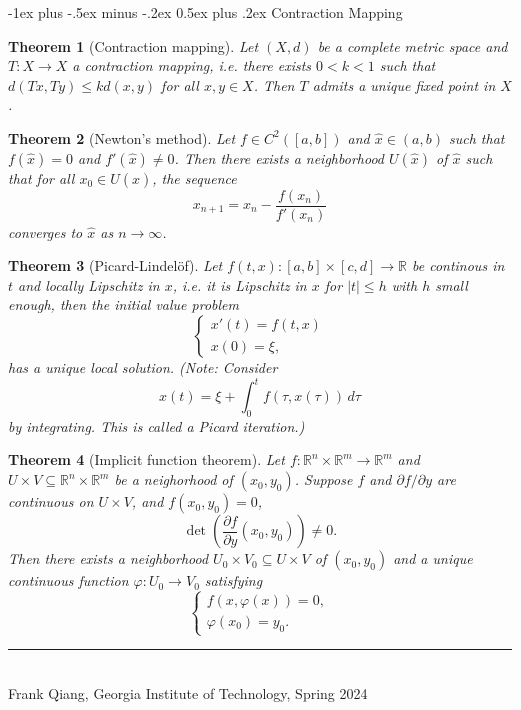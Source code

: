 \documentclass[10pt,landscape]{article}
\makeatletter
\newtheorem{theorem}{Theorem}
\newcommand{\R}{\mathbb{R}}
\renewcommand{\section}{\@startsection{section}{1}{0mm}%
                                {-1ex plus -.5ex minus -.2ex}%
                                {0.5ex plus .2ex}%
                                {\normalfont\large\bfseries}}
\makeatother
\begin{document}
\begin{multicols}{3}
\section{Contraction Mapping}
\begin{theorem}[Contraction mapping]
  Let $(X, d)$ be a complete metric space and
  $T : X \to X$ a contraction mapping, i.e.
  there exists $0 < k < 1$ such that
  $d(Tx, Ty) \le k d(x, y)$ for all $x, y \in X$.
  Then $T$ admits a unique fixed point in $X$.
\end{theorem}

\begin{theorem}[Newton's method]
  Let $f \in C^2([a, b])$ and $\hat{x} \in (a, b)$
  such that $f(\hat{x}) = 0$ and $f'(\hat{x}) \ne 0$.
  Then there exists a neighborhood $U(\hat{x})$ of
  $\hat{x}$ such that for all $x_0 \in U(\hat{x})$,
  the sequence
  \[
    x_{n + 1} = x_n - \frac{f(x_n)}{f'(x_n)}
  \]
  converges to $\hat{x}$ as $n \to \infty$.
\end{theorem}

\begin{theorem}[Picard-Lindel\"of]
  Let $f(t, x) : [a, b] \times [c, d] \to \R$ be continous
  in $t$ and locally Lipschitz in $x$, i.e. it is
  Lipschitz in $x$ for $|t| \le h$ with $h$ small enough,
  then the initial value problem
  \[
    \begin{cases}
      x'(t) = f(t, x) \\
      x(0) = \xi,
    \end{cases}
  \]
  has a unique local solution. (Note: Consider
  \[
    x(t) = \xi + \int_0^t f(\tau, x(\tau))\, d\tau
  \]
  by integrating. This is called a \emph{Picard iteration}.)
\end{theorem}

\begin{theorem}[Implicit function theorem]
  Let $f : \R^n \times \R^m \to \R^m$ and
  $U \times V \subseteq \R^n \times \R^m$ be a neighorhood
  of $(x_0, y_0)$. Suppose $f$ and $\partial f / \partial y$
  are continuous on $U \times V$, and $f(x_0, y_0) = 0$,
  \[
    \det\left(\frac{\partial f}{\partial y}(x_0, y_0)\right)
    \ne 0.
  \]
  Then there exists a neighborhood $U_0 \times V_0 \subseteq U \times V$ of
  $(x_0, y_0)$ and a unique continuous function
  $\varphi : U_0 \to V_0$ satisfying
  \[
  \begin{cases}
    f(x, \varphi(x)) = 0, \\
    \varphi(x_0) = y_0.
  \end{cases}
  \]
\end{theorem}

\vfill
\hrule
~\\
Frank Qiang, Georgia Institute of Technology, Spring 2024
\end{multicols}
\end{document}
